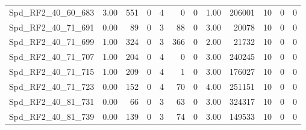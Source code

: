 \begin{longtable}[c]{@{}lrrrrrrrrrrr@{}}
Spd\_RF2\_40\_60\_683        & 3.00                   & 551                     & 0                       & 4                      & 0                       & 0                       & 1.00                    & 206001                   & 10                       & 0                        & 0                        \\
Spd\_RF2\_40\_71\_691        & 0.00                   & 89                      & 0                       & 3                      & 88                      & 0                       & 3.00                    & 20078                    & 10                       & 0                        & 0                        \\
Spd\_RF2\_40\_71\_699        & 1.00                   & 324                     & 0                       & 3                      & 366                     & 0                       & 2.00                    & 21732                    & 10                       & 0                        & 0                        \\
Spd\_RF2\_40\_71\_707        & 1.00                   & 204                     & 0                       & 4                      & 0                       & 0                       & 3.00                    & 240245                   & 10                       & 0                        & 0                        \\
Spd\_RF2\_40\_71\_715        & 1.00                   & 209                     & 0                       & 4                      & 1                       & 0                       & 3.00                    & 176027                   & 10                       & 0                        & 0                        \\
Spd\_RF2\_40\_71\_723        & 0.00                   & 152                     & 0                       & 4                      & 70                      & 0                       & 4.00                    & 251151                   & 10                       & 0                        & 0                        \\
Spd\_RF2\_40\_81\_731        & 0.00                   & 66                      & 0                       & 3                      & 63                      & 0                       & 3.00                    & 324317                   & 10                       & 0                        & 0                        \\
Spd\_RF2\_40\_81\_739        & 0.00                   & 139                     & 0                       & 3                      & 74                      & 0                       & 3.00                    & 149533                   & 10                       & 0                        & 0                        \\

\end{longtable}

